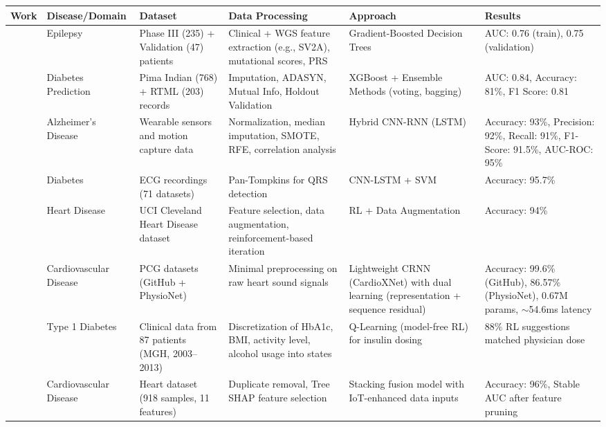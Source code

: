 \begin{table}[htbp]
\begin{adjustwidth}{-2cm}{-2cm}
\centering
\scriptsize
\begin{tabular}{|p{1.5cm}|p{2.5cm}|p{3cm}|p{3.5cm}|p{2.5cm}|p{2.5cm}|}
\hline
\textbf{Work} & \textbf{Disease/Domain} & \textbf{Dataset} & \textbf{Data Processing} & \textbf{Approach} & \textbf{Results} \\
\hline
\cite{article_1} & Epilepsy & Phase III (235) + Validation (47) patients & Clinical + WGS feature extraction (e.g., SV2A), mutational scores, PRS & Gradient-Boosted Decision Trees & AUC: 0.76 (train), 0.75 (validation) \\
\hline
\cite{article_2} & Diabetes Prediction & Pima Indian (768) + RTML (203) records & Imputation, ADASYN, Mutual Info, Holdout Validation & XGBoost + Ensemble Methods (voting, bagging) & AUC: 0.84, Accuracy: 81\%, F1 Score: 0.81 \\
\hline
\cite{article_3} & Alzheimer's Disease & Wearable sensors and motion capture data & Normalization, median imputation, SMOTE, RFE, correlation analysis & Hybrid CNN-RNN (LSTM) & Accuracy: 93\%, Precision: 92\%, Recall: 91\%, F1-Score: 91.5\%, AUC-ROC: 95\% \\
\hline
\cite{article_4} & Diabetes & ECG recordings (71 datasets) & Pan-Tompkins for QRS detection & CNN-LSTM + SVM & Accuracy: 95.7\% \\
\hline
\cite{article_5} & Heart Disease & UCI Cleveland Heart Disease dataset & Feature selection, data augmentation, reinforcement-based iteration & RL + Data Augmentation & Accuracy: 94\% \\
\hline
\cite{article_6} & Cardiovascular Disease & PCG datasets (GitHub + PhysioNet) & Minimal preprocessing on raw heart sound signals & Lightweight CRNN (CardioXNet) with dual learning (representation + sequence residual) & Accuracy: 99.6\% (GitHub), 86.57\% (PhysioNet), 0.67M params, $\sim$54.6ms latency \\
\hline
\cite{article_7} & Type 1 Diabetes & Clinical data from 87 patients (MGH, 2003–2013) & Discretization of HbA1c, BMI, activity level, alcohol usage into states & Q-Learning (model-free RL) for insulin dosing & 88\% RL suggestions matched physician dose \\
\hline
\cite{article_8} & Cardiovascular Disease & Heart dataset (918 samples, 11 features) & Duplicate removal, Tree SHAP feature selection & Stacking fusion model with IoT-enhanced data inputs & Accuracy: 96\%, Stable AUC after feature pruning \\

\end{tabular}
\end{adjustwidth}
\end{table}
